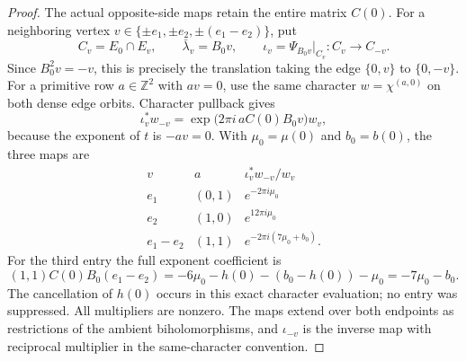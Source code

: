 \begin{proof}
The actual opposite-side maps retain the entire matrix \(C(0)\).
For a neighboring vertex
\(v\in\{\pm e_1,\pm e_2,\pm(e_1-e_2)\}\), put
\[
 C_v=E_0\cap E_v,\qquad
 \bar\lambda_v=B_0v,\qquad
 \iota_v=\Psi_{B_0v}|_{C_v}:C_v\longrightarrow C_{-v}.
\]
Since \(B_0^2v=-v\), this is precisely the translation taking the edge
\(\{0,v\}\) to \(\{0,-v\}\).  For a primitive row \(a\in\mathbb Z^2\)
with \(av=0\), use the same character \(w=\chi^{(a,0)}\) on both
dense edge orbits.  Character pullback gives
\begin{equation}
 \iota_v^*w_{-v}=\exp\bigl(2\pi i\,aC(0)B_0v\bigr)w_v,
 \label{wb:eq:cusp-exact-opposite-edge}
\end{equation}
because the exponent of \(t\) is \(-av=0\).  With
\(\mu_0=\mu(0)\) and \(b_0=b(0)\), the three maps are
\[
\begin{array}{c|c|c}
 v&a&\iota_v^*w_{-v}/w_v\\\hline
 e_1&(0,1)&e^{-2\pi i\mu_0}\\
 e_2&(1,0)&e^{12\pi i\mu_0}\\
 e_1-e_2&(1,1)&e^{-2\pi i(7\mu_0+b_0)}.
\end{array}
\]
For the third entry the full exponent coefficient is
\[
 (1,1)C(0)B_0(e_1-e_2)
 =-6\mu_0-h(0)-(b_0-h(0))-\mu_0=-7\mu_0-b_0.
\]
The cancellation of \(h(0)\) occurs in this exact character evaluation;
no entry was suppressed.  All multipliers are nonzero.  The maps extend
over both endpoints as restrictions of the ambient biholomorphisms, and
\(\iota_{-v}\) is the inverse map with reciprocal multiplier in the
same-character convention.
\end{proof}